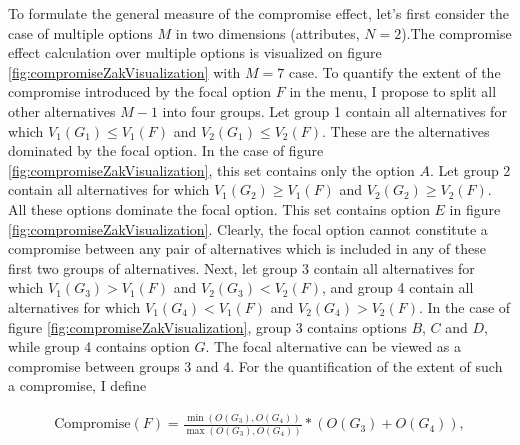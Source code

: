 \documentclass[a4paper,12pt]{article}
\begin{document}
To formulate the general measure of the compromise effect, let's first consider the case of multiple options $M$ in two dimensions (attributes, $N = 2$).The compromise effect  calculation over multiple options is visualized on figure \ref{fig:compromiseZakVisualization} with $M = 7$ case. To quantify the extent of the compromise introduced by the focal option $F$ in the menu, I propose to split all other alternatives $M - 1$ into four groups. Let group 1 contain all alternatives for which $V_1(G_1 ) \le V_1(F)$ and $V_2(G_1 ) \le V_2(F)$. These are the alternatives dominated by the focal option. In the case of figure \ref{fig:compromiseZakVisualization}, this set contains only the option $A$. Let group 2 contain all alternatives for which $V_1(G_2 ) \ge V_1(F)$ and $V_2(G_2 ) \ge V_2(F)$. All these options dominate the focal option. This set contains option $E$ in figure \ref{fig:compromiseZakVisualization}. Clearly, the focal option cannot constitute a compromise between any pair of alternatives which is included in any of these first two groups of alternatives. Next, let group 3 contain all alternatives for which $V_1(G_3 ) > V_1(F)$ and $V_2(G_3 ) < V_2(F)$, and group 4 contain all alternatives for which $V_1(G_4 ) < V_1(F)$ and $V_2(G_4 ) > V_2(F)$. In the case of figure \ref{fig:compromiseZakVisualization}, group 3 contains options $B$, $C$ and $D$, while group 4 contains option $G$. The focal alternative can be viewed as a compromise between groups 3 and 4. For the quantification of the extent of such a compromise, I define

\begin{align}\label{}
    \text{Compromise}(F) = \frac{\min(O(G_3), O(G_4))}{\max(O(G_3), O(G_4))} * (O(G_3) + O(G_4)) ,
\end{align}
\end{document}
